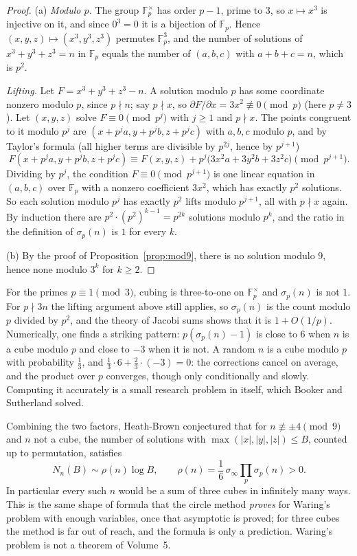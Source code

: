 \begin{proof}
(a) \emph{Modulo $p$.} The group $\mathbb F_p^\times$ has order $p-1$, prime to $3$, so $x\mapsto x^3$ is injective on it, and since $0^3=0$ it is a bijection of $\mathbb F_p$. Hence $(x,y,z)\mapsto(x^3,y^3,z^3)$ permutes $\mathbb F_p^3$, and
the number of solutions of $x^3+y^3+z^3=n$ in $\mathbb F_p$ equals the number of $(a,b,c)$ with $a+b+c=n$, which is $p^2$.

\emph{Lifting.} Let $F=x^3+y^3+z^3-n$. A solution modulo $p$ has some coordinate nonzero modulo $p$, since $p\nmid n$; say $p\nmid x$, so $\partial F/\partial x=3x^2\not\equiv0\pmod p$ (here $p\ne3$). Let $(x,y,z)$
solve $F\equiv0\pmod{p^j}$ with $j\ge1$ and $p\nmid x$. The points congruent to it modulo $p^j$ are $(x+p^ja,y+p^jb,z+p^jc)$ with $a,b,c$ modulo $p$, and by Taylor's formula (all higher terms are
divisible by $p^{2j}$, hence by $p^{j+1}$)
\[
F(x+p^ja,y+p^jb,z+p^jc)\equiv F(x,y,z)+p^j\bigl(3x^2a+3y^2b+3z^2c\bigr)\pmod{p^{j+1}}.
\]
Dividing by $p^j$, the condition $F\equiv0\pmod{p^{j+1}}$ is one linear equation in $(a,b,c)$ over $\mathbb F_p$ with a nonzero coefficient $3x^2$, which has exactly $p^2$ solutions. So each solution modulo $p^j$ has exactly $p^2$
lifts modulo $p^{j+1}$, all with $p\nmid x$ again. By induction there are $p^2\cdot(p^2)^{k-1}=p^{2k}$ solutions modulo $p^k$, and the ratio in the definition of $\sigma_p(n)$ is $1$ for every $k$.

(b) By the proof of Proposition~\ref{prop:mod9}, there is no solution modulo $9$, hence none modulo $3^k$ for $k\ge2$.
\end{proof}

For the primes $p\equiv1\pmod3$, cubing is three-to-one on $\mathbb F_p^\times$ and $\sigma_p(n)$ is not $1$. For $p\nmid3n$ the lifting argument above still applies, so $\sigma_p(n)$ is the count modulo $p$ divided by $p^2$, and the theory of Jacobi sums shows that it is $1+O(1/p)$. Numerically, one finds a striking pattern: $p(\sigma_p(n)-1)$ is close to $6$ when $n$ is a cube modulo $p$ and close to $-3$ when it is not. A random $n$ is a cube modulo $p$ with probability $\frac13$, and $\frac13\cdot6+\frac23\cdot(-3)=0$: the corrections cancel on average, and the product over $p$ converges, though only conditionally and slowly. Computing it accurately is a small research problem in itself, which Booker and Sutherland solved.

\begin{remark}\label{rem:hb}
Combining the two factors, Heath-Brown conjectured that for $n\not\equiv\pm4\pmod9$ and $n$ not a cube, the number of solutions with $\max(|x|,|y|,|z|)\le B$, counted up to permutation, satisfies
\[
N_n(B)\sim\rho(n)\log B,\qquad\rho(n)=\frac16\,\sigma_\infty\prod_p\sigma_p(n)>0.
\]
In particular every such $n$ would be a sum of three cubes in infinitely many ways. This is the same shape of formula that the circle method \emph{proves} for Waring's problem with
enough variables, once that asymptotic is proved; for three cubes the method is far out of reach, and the formula is only a prediction. Waring's problem is not a theorem of Volume~5.
\end{remark}

